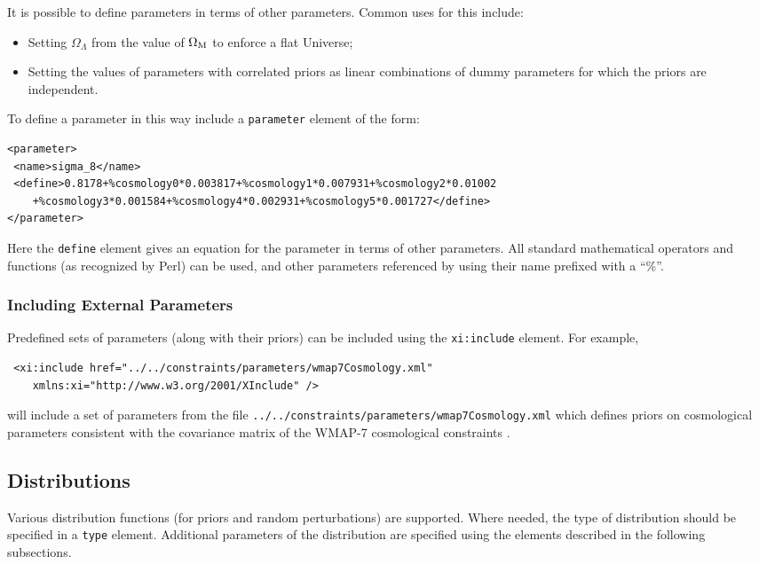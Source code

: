 It is possible to define parameters in terms of other parameters. Common uses for this include:
\begin{itemize}
 \item Setting $\Omega_\Lambda$ from the value of $\Omega_{\rm M}$ to enforce a flat Universe;
 \item Setting the values of parameters with correlated priors as linear combinations of dummy parameters for which the priors are independent.
\end{itemize}
To define a parameter in this way include a {\tt parameter} element of the form:
\begin{verbatim}
<parameter>
 <name>sigma_8</name>
 <define>0.8178+%cosmology0*0.003817+%cosmology1*0.007931+%cosmology2*0.01002
    +%cosmology3*0.001584+%cosmology4*0.002931+%cosmology5*0.001727</define>
</parameter>
\end{verbatim}
Here the {\tt define} element gives an equation for the parameter in terms of other parameters. All standard mathematical operators and functions (as recognized by Perl) can be used, and other parameters referenced by using their name prefixed with a ``\%''.

\subsubsection{Including External Parameters}

Predefined sets of parameters (along with their priors) can be included using the {\tt xi:include} element. For example,
\begin{verbatim}
 <xi:include href="../../constraints/parameters/wmap7Cosmology.xml"
    xmlns:xi="http://www.w3.org/2001/XInclude" />
\end{verbatim}
will include a set of parameters from the file {\tt ../../constraints/parameters/wmap7Cosmology.xml} which defines priors on cosmological parameters consistent with the covariance matrix of the WMAP-7 cosmological constraints \citep{komatsu_seven-year_2010}.

\subsection{Distributions}

Various distribution functions (for priors and random perturbations) are supported. Where needed, the type of distribution should be specified in a {\tt type} element. Additional parameters of the distribution are specified using the elements described in the following subsections.

